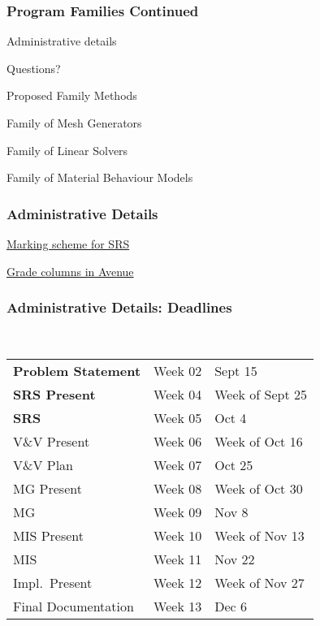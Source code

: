 \documentclass[t,12pt,numbers,fleqn]{beamer}
\begin{document}



\begin{frame}
\frametitle{Program Families Continued}

\bi
\item Administrative details
\item Questions?
\item Proposed Family Methods
\item Family of Mesh Generators
\item Family of Linear Solvers
\item Family of Material Behaviour Models
\ei
\end{frame}


\begin{frame}
\frametitle{Administrative Details}

\bi
\item \href{http://avenue.mcmaster.ca/index.html}{Marking scheme for SRS}
\item \href{http://avenue.mcmaster.ca/index.html}{Grade columns in Avenue}
\ei

\end{frame}


\begin{frame}
\frametitle{Administrative Details: Deadlines}
~\newline
\begin{tabular}{l l l}
\textbf{Problem Statement} & Week 02 & Sept 15\\
\textbf{SRS Present} & Week 04 & Week of Sept 25\\
\textbf{SRS} & Week 05 & Oct 4\\
V\&V Present & Week 06 & Week of Oct 16\\
V\&V Plan & Week 07 & Oct 25\\
MG Present & Week 08 & Week of Oct 30\\
MG & Week 09 & Nov 8\\
MIS Present & Week 10 & Week of Nov 13\\
MIS & Week 11 & Nov 22\\
Impl.\ Present & Week 12 & Week of Nov 27\\
Final Documentation & Week 13 & Dec 6\\
\end {tabular}

\end{frame}
\end{document}
